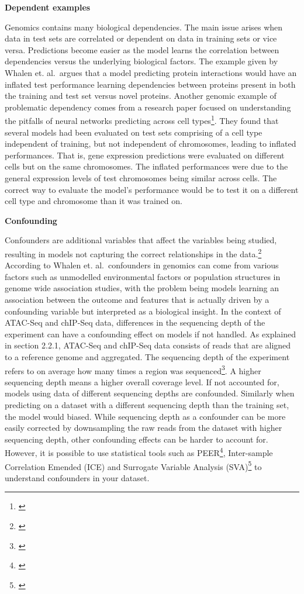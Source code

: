 \documentclass[
]{book}
\begin{document}
\textbf{Dependent examples}

Genomics contains many biological dependencies. The main issue arises when data in test sets are correlated or dependent on data in training sets or vice versa. Predictions become easier as the model learns the correlation between dependencies versus the underlying biological factors. The example given by Whalen et. al.~argues that a model predicting protein interactions would have an inflated test performance learning dependencies between proteins present in both the training and test set versus novel proteins.
Another genomic example of problematic dependency comes from a research paper focused on understanding the pitfalls of neural networks predicting across cell types\footnote{\citet{jacob2020}}. They found that several models had been evaluated on test sets comprising of a cell type independent of training, but not independent of chromosomes, leading to inflated performances. That is, gene expression predictions were evaluated on different cells but on the same chromosomes. The inflated performances were due to the general expression levels of test chromosomes being similar across cells. The correct way to evaluate the model's performance would be to test it on a different cell type and chromosome than it was trained on.

\textbf{Confounding}

Confounders are additional variables that affect the variables being studied, resulting in models not capturing the correct relationships in the data.\footnote{\citet{mo2012}} According to Whalen et. al.~confounders in genomics can come from various factors such as unmodelled environmental factors or population structures in genome wide association studies, with the problem being models learning an association between the outcome and features that is actually driven by a confounding variable but interpreted as a biological insight.
In the context of ATAC-Seq and chIP-Seq data, differences in the sequencing depth of the experiment can have a confounding effect on models if not handled. As explained in section 2.2.1, ATAC-Seq and chIP-Seq data consists of reads that are aligned to a reference genome and aggregated. The sequencing depth of the experiment refers to on average how many times a region was sequenced\footnote{\citet{sims2014}}. A higher sequencing depth means a higher overall coverage level. If not accounted for, models using data of different sequencing depths are confounded. Similarly when predicting on a dataset with a different sequencing depth than the training set, the model would biased. While sequencing depth as a confounder can be more easily corrected by downsampling the raw reads from the dataset with higher sequencing depth, other confounding effects can be harder to account for. However, it is possible to use statistical tools such as PEER\footnote{\citet{oliver2012}}, Inter-sample Correlation Emended (ICE) and Surrogate Variable Analysis (SVA)\footnote{\citet{jen2010}} to understand confounders in your dataset.
\end{document}

